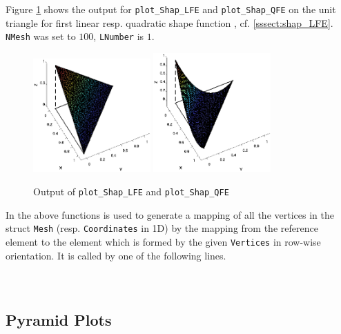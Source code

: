  
 Figure \ref{fig:plot_Shap} shows the output for {\tt plot\_Shap\_LFE} and {\tt plot\_Shap\_QFE} on the unit triangle for first linear resp. quadratic shape function , cf. \ref{sssect:shap_LFE}. {\tt NMesh} was set to $100$, {\tt LNumber} is $1$. \\

\begin{figure}[htb]
  \centering
  \begin{minipage}[c]{0.8\textwidth}
    \includegraphics[width=0.4\textwidth]{plot_Shap_LFE.eps} \hfill
    \includegraphics[width=0.4\textwidth]{plot_Shap_QFE.eps}
  \end{minipage}
  \caption{Output of {\tt plot\_Shap\_LFE} and {\tt plot\_Shap\_QFE}}
  \label{fig:plot_Shap}
\end{figure}

 In the above functions  is used to generate a mapping of all the vertices in the struct {\tt Mesh} (resp. {\tt Coordinates} in 1D) by the mapping from the reference element to the element which is formed by the given {\tt Vertices} in row-wise orientation. It is called by one of the following lines. \\

 \\
 \\


\subsection{Pyramid Plots} 

